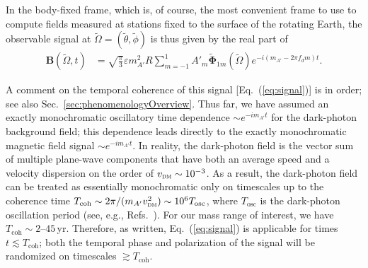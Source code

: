 \documentclass[amsmath,amssymb,aps,10pt,prd,letterpaper,nofootinbib,balancelastpage,notitlepage,superscriptaddress,twocolumn,floatfix]{revtex4-2}
\newcommand{\secref}[2][]{Sec{#1}.~\ref{#2}}		%
\renewcommand{\eqref}[2][]{Eq{#1}.~(\ref{eq:#2})}	%
\newcommand{\citeR}[2][]{Ref{#1}.~\cite{#2}}		%
\begin{document}
In the body-fixed frame, which is, of course, the most convenient frame to use to compute fields measured at stations fixed to the surface of the rotating Earth, the observable signal at $\tilde\Omega=(\tilde{\theta},\tilde{\phi})$ is thus given by the real part of
\begin{align}
    \bm{B}(\tilde{\Omega},t)&=\sqrt{\frac\pi3}\varepsilon m_{A'}^2R \sum_{m=-1}^1A'_m\bm{\tilde{\Phi}}_{1m}(\tilde\Omega)e^{-i(m_{A'}-2\pi f_dm)t}.
    \label{eq:signal}
\end{align}

A comment on the temporal coherence of this signal [\eqref{signal}] is in order; see also \secref{sec:phenomenologyOverview}.
Thus far, we have assumed an exactly monochromatic oscillatory time dependence $\sim e^{-im_{A'}t}$ for the dark-photon background field; this dependence leads directly to the exactly monochromatic magnetic field signal $\sim e^{-im_{A'}t}$.
In reality, the dark-photon field is the vector sum of multiple plane-wave components that have both an average speed and a velocity dispersion on the order of $v_{\textsc{dm}}\sim 10^{-3}$.
As a result, the dark-photon field can be treated as essentially monochromatic only on timescales up to the coherence time $T_\text{coh}\sim 2\pi/(m_{A'} v_{\textsc{dm}}^2) \sim 10^6 T_{\text{osc}}$, where $T_{\text{osc}}$ is the dark-photon oscillation period (see, e.g., \citeR[s]{Graham:2013gfa,Chaudhuri:2014dla}).
For our mass range of interest, we have $T_\text{coh}\sim 2$--$45\,$yr.
Therefore, as written, \eqref{signal} is applicable for times $t\lesssim T_\text{coh}$; both the temporal phase and polarization of the signal will be randomized on timescales $\gtrsim T_\text{coh}$.
\end{document}
